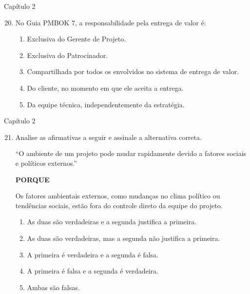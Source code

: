 \documentclass{beamer}
\begin{document}
\begin{frame}{Capítulo 2}
	\begin{enumerate}
		\setcounter{enumi}{19}
		\justifying
		\item No Guia PMBOK 7, a responsabilidade pela entrega de valor é:
		\begin{enumerate}[a]
			\justifying
			\item Exclusiva do Gerente de Projeto.
			\item Exclusiva do Patrocinador.
			\item \alert<2>{Compartilhada por todos os envolvidos no sistema de entrega de valor}.
			\item Do cliente, no momento em que ele aceita a entrega.
			\item Da equipe técnica, independentemente da estratégia.
		\end{enumerate}
	\end{enumerate}
\end{frame}

\begin{frame}{Capítulo 2}
	\begin{enumerate}
		\setcounter{enumi}{20}
		\justifying
		\item Analise as afirmativas a seguir e assinale a alternativa correta.
		
		\vspace{10pt}
		``O ambiente de um projeto pode mudar rapidamente devido a fatores sociais e políticos externos.''
		
		\vspace{10pt}
		\centering \textbf{PORQUE}
		
		\vspace{10pt}
		\justifying
		Os fatores ambientais externos, como mudanças no clima político ou tendências sociais, estão fora do controle direto da equipe do projeto.
		
		\vspace{10pt}
		\begin{enumerate}[a]
			\item \alert<2>{As duas são verdadeiras e a segunda justifica a primeira}.
			\item As duas são verdadeiras, mas a segunda não justifica a primeira.
			\item A primeira é verdadeira e a segunda é falsa.
			\item A primeira é falsa e a segunda é verdadeira.
			\item Ambas são falsas.
		\end{enumerate}
	\end{enumerate}
\end{frame}
\end{document}
